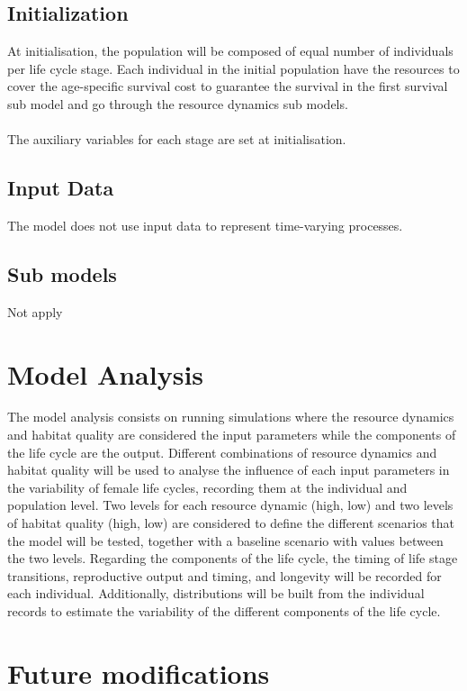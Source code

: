 \documentclass{article}
\begin{document}
\subsection{Initialization}

At initialisation, the population will be composed of equal number of individuals per life cycle stage. Each individual in the initial population have the resources to cover the age-specific survival cost to guarantee the survival in the first survival sub model and go through the resource dynamics sub models.
\\\\
The auxiliary variables for each stage are set at initialisation.

\subsection{Input Data}

The model does not use input data to represent time-varying processes.

\subsection{Sub models}

Not apply

\section{Model Analysis}

The model analysis consists on running simulations where the resource dynamics and habitat quality are considered the input parameters while the components of the life cycle are the output. Different combinations of resource dynamics and habitat quality will be used to analyse the influence of each input parameters in the variability of female life cycles, recording them at the individual and population level. Two levels for each resource dynamic (high, low) and two levels of habitat quality (high, low) are considered to define the different scenarios that the model will be tested, together with a baseline scenario with values between the two levels. Regarding the components of the life cycle, the timing of life stage transitions, reproductive output and timing, and longevity will be recorded for each individual. Additionally, distributions will be built from the individual records to estimate the variability of the different components of the life cycle.

\section{Future modifications}
\end{document}
